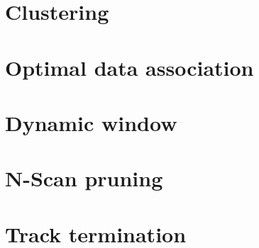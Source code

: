 
\section{Clustering}

\section{Optimal data association}


\section{Dynamic window}

\section{N-Scan pruning}

\section{Track termination}